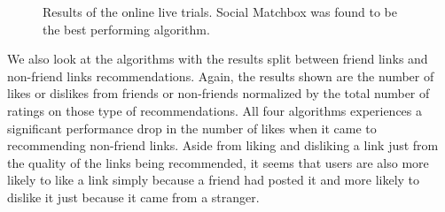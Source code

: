 \begin{figure}[h!]
\centering
{}
\caption{Results of the online live trials. Social Matchbox was found to be the best performing algorithm.}
\end{figure}

We also look at the algorithms with the results split between friend links and non-friend links recommendations. Again, the results shown are the number of likes or dislikes from friends or non-friends normalized by the total number of ratings on those type of recommendations. All four algorithms experiences a significant performance drop in the number of likes when it came to recommending non-friend links. Aside from liking and disliking a link just from the quality of the links being recommended, it seems that users are also more likely to like a link simply because a friend had posted it and more likely to dislike it just because it came from a stranger.

